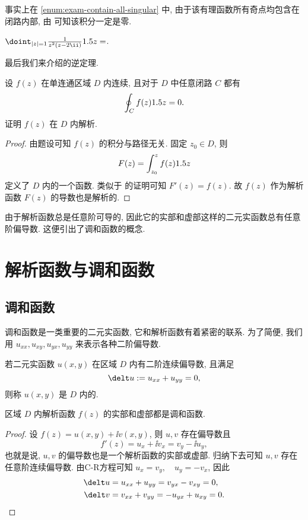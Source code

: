 事实上在 \ref{enum:exam-contain-all-singular} 中, 由于该有理函数所有奇点均包含在闭路内部, 由 可知该积分一定是零.

\begin{exercise}
  $\doint_{|z|=1}\frac1{z^2(z-2\ii)}\d z=$\fillblank{}.
\end{exercise}

最后我们来介绍\thmCG 的逆定理.
\begin{example}[莫累拉定理]
  设 $f(z)$ 在单连通区域 $D$ 内连续, 且对于 $D$ 中任意闭路 $C$ 都有
  \[
    \oint_C f(z)1.5 z=0.
  \]
  证明 $f(z)$ 在 $D$ 内解析.
\end{example}

\begin{proof}
  由题设可知 $f(z)$ 的积分与路径无关.
  固定 $z_0\in D$, 则
  \[
    F(z)=\int_{z_0}^zf(z)1.5 z
  \]
  定义了 $D$ 内的一个函数.
  类似于 的证明可知 $F'(z)=f(z)$.
  故 $f(z)$ 作为解析函数 $F(z)$ 的导数也是解析的.
\end{proof}

由于解析函数总是任意阶可导的, 因此它的实部和虚部这样的二元实函数总有任意阶偏导数.
这便引出了调和函数的概念.



\section{解析函数与调和函数}

\subsection{调和函数}

调和函数是一类重要的二元实函数, 它和解析函数有着紧密的联系.
为了简便, 我们用 $u_{xx},u_{xy},u_{yx},u_{yy}$ 来表示各种二阶偏导数.

\begin{definition}
  若二元实函数 $u(x,y)$ 在区域 $D$ 内有二阶连续偏导数, 且满足
  \[
    \delt u:=u_{xx}+u_{yy}=0,
  \]
  则称 $u(x,y)$ 是 $D$ 内的.
\end{definition}

\begin{theorem}
  区域 $D$ 内解析函数 $f(z)$ 的实部和虚部都是调和函数.
\end{theorem}

\begin{proof}
  设 $f(z)=u(x,y)+\ii v(x,y)$, 则 $u,v$ 存在偏导数且
  \[
    f'(z)=u_x+\ii v_x=v_y-\ii u_y,
  \]
  也就是说, $u,v$ 的偏导数也是一个解析函数的实部或虚部.
  归纳下去可知 $u,v$ 存在任意阶连续偏导数.
  由C-R方程可知 $u_x=v_y,\quad u_y=-v_x$, 因此
  \begin{align*}
    \delt u&=u_{xx}+u_{yy}=v_{yx}-v_{xy}=0,\\
    \delt v&=v_{xx}+v_{yy}=-u_{yx}+u_{xy}=0.\qedhere
  \end{align*}
\end{proof}


